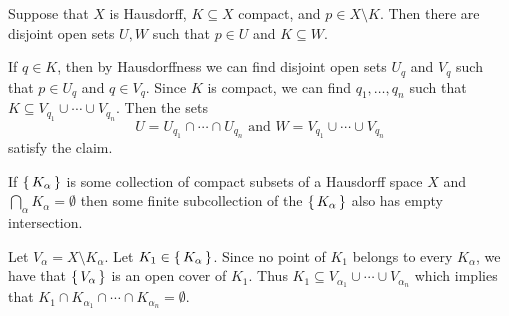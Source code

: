 \documentclass[letterpaper, 11pt, oneside]{book}
\begin{document}
\begin{lem}\label{lem: separate_point_compact_Hausdorff}
  Suppose that $X$ is Hausdorff, $K \subseteq X$ compact, and $p \in X \setminus K$.
  Then there are disjoint open sets $U, W$ such that $p \in U$ and $K \subseteq W$.
\end{lem}
\begin{pf}
  If $q \in K$, then by Hausdorffness we can find disjoint open sets $U_{q}$ and $V_{q}$ such that $p \in U_{q}$ and $q \in V_{q}$.
  Since $K$ is compact, we can find $q_{1}, \ldots, q_{n}$ such that $K \subseteq V_{q_{1}} \cup \cdots \cup V_{q_{n}}$.
  Then the sets
  \[
    U = U_{q_{1}} \cap \cdots \cap U_{q_{n}} \text{ and } W = V_{q_{1}} \cup \cdots \cup V_{q_{n}}
  \]
  satisfy the claim.
\end{pf}

\clearpage

\begin{lem}\label{lem: finite_subcollection_empty}
  If $\set{K_{\alpha}}$ is some collection of compact subsets of a Hausdorff space $X$ and $\bigcap_{\alpha} K_{\alpha} = \emptyset$ then some finite subcollection of the $\set{K_{\alpha}}$ also has empty intersection.
\end{lem}
\begin{pf}
  Let $V_{\alpha} = X \setminus K_{\alpha}$.
  Let $K_{1} \in \set{K_{\alpha}}$.
  Since no point of $K_{1}$ belongs to every $K_{\alpha}$, we have that $\set{V_{\alpha}}$ is an open cover of $K_{1}$.
  Thus $K_{1} \subseteq V_{\alpha_{1}} \cup \cdots \cup V_{\alpha_{n}}$ which implies that $K_{1} \cap K_{\alpha_{1}} \cap \cdots \cap K_{\alpha_{n}} = \emptyset$.
\end{pf}
\end{document}
